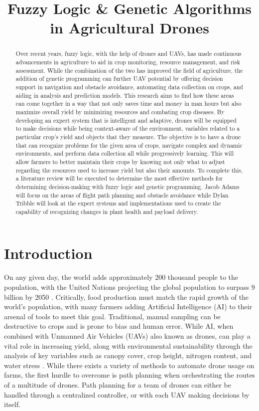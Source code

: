 \documentclass{IEEEtran}
\title{Fuzzy Logic \& Genetic Algorithms in Agricultural Drones}
\author{
    \IEEEauthorblockN{Dylan Tribble}
    \and
    \IEEEauthorblockN{Jacob Adams}
}
\begin{document}
\maketitle
\begin{abstract}
Over recent years, fuzzy logic, with the help of drones and UAVs, has made continuous advancements in agriculture to aid in crop monitoring, resource management, and risk assessment. While the combination of the two has improved the field of agriculture, the addition of genetic programming can further UAV potential by offering decision support in navigation and obstacle avoidance, automating data collection on crops, and aiding in analysis and prediction models. This research aims to find how these areas can come together in a way that not only saves time and money in man hours but also maximize overall yield by minimizing resources and combating crop diseases. By developing an expert system that is intelligent and adaptive, drones will be equipped to make decisions while being context-aware of the environment, variables related to a particular crop's yield and objects that they measure. The objective is to have a drone that can recognize problems for the given area of crops, navigate complex and dynamic environments, and perform data collection all while progressively learning. This will allow farmers to better maintain their crops by knowing not only what to adjust regarding the resources used to increase yield but also their amounts. To complete this, a literature review will be executed to determine the most effective methods for determining decision-making with fuzzy logic and genetic programming. Jacob Adams will focus on the areas of flight path planning and obstacle avoidance while Dylan Tribble will look at the expert systems and implementations used to create the capability of recognizing changes in plant health and payload delivery. 
\end{abstract}

\section{Introduction}
On any given day, the world adds approximately 200 thousand people to the population, with the United Nations projecting the global population to surpass 9 billion by 2050 \cite{HAFEEZ2023192} \cite{United_Nations}.
Critically, food production must match the rapid growth of the world's population, with many farmers adding Artificial Intelligence (AI) to their arsenal of tools to meet this goal. Traditional, manual sampling
can be destructive to crops and is prone to bias and human error. While AI, when combined with Unmanned Air Vehicles (UAVs) also known as drones, can play a vital role in increasing yield, along with environmental
sustainability through the analysis of key variables such as canopy cover, crop height, nitrogen content, and water stress \cite{key7}. While there exists a variety of methods to automate drone usage on farms,
the first hurdle to overcome is path planning when orchestrating the routes of a multitude of drones. Path planning for a team of drones can either be handled through a centralized controller, or with each UAV making decisions
by itself.
\end{document}
